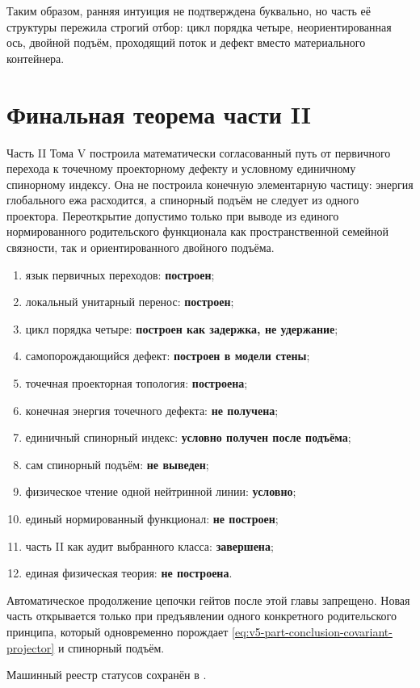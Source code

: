 Таким образом, ранняя интуиция не подтверждена буквально, но часть её
структуры пережила строгий отбор: цикл порядка четыре, неориентированная
ось, двойной подъём, проходящий поток и дефект вместо материального
контейнера.

\section{Финальная теорема части II}

\begin{theorem}
Часть II Тома V построила математически согласованный путь от первичного
перехода к точечному проекторному дефекту и условному единичному
спинорному индексу. Она не построила конечную элементарную частицу:
энергия глобального ежа расходится, а спинорный подъём не следует из
одного проектора. Переоткрытие допустимо только при выводе из единого
нормированного родительского функционала как пространственной семейной
связности, так и ориентированного двойного подъёма.
\end{theorem}

\begin{protocol}
\begin{enumerate}
 \item язык первичных переходов: \textbf{построен};
 \item локальный унитарный перенос: \textbf{построен};
 \item цикл порядка четыре: \textbf{построен как задержка, не удержание};
 \item самопорождающийся дефект: \textbf{построен в модели стены};
 \item точечная проекторная топология: \textbf{построена};
 \item конечная энергия точечного дефекта: \textbf{не получена};
 \item единичный спинорный индекс: \textbf{условно получен после подъёма};
 \item сам спинорный подъём: \textbf{не выведен};
 \item физическое чтение одной нейтринной линии: \textbf{условно};
 \item единый нормированный функционал: \textbf{не построен};
 \item часть II как аудит выбранного класса: \textbf{завершена};
 \item единая физическая теория: \textbf{не построена}.
\end{enumerate}
\end{protocol}

Автоматическое продолжение цепочки гейтов после этой главы запрещено.
Новая часть открывается только при предъявлении одного конкретного
родительского принципа, который одновременно порождает
\eqref{eq:v5-part-conclusion-covariant-projector} и спинорный подъём.

Машинный реестр статусов сохранён в
.